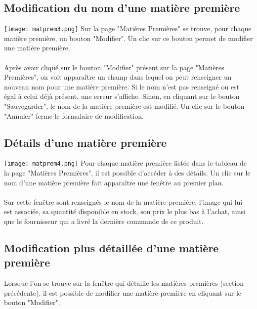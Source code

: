 \subsection{Modification du nom d'une matière première}
\texttt{[image: matprem3.png]}
Sur la page "Matières Premières" se trouve, pour chaque matière première, 
un bouton "Modifier". Un clic sur ce bouton permet de modifier une matière 
première.

\paragraph{}
Après avoir cliqué sur le bouton "Modifier" présent sur la page "Matières 
Premières", on voit apparaître un champ dans lequel on peut renseigner un 
nouveau nom pour une matière première. Si le nom n'est pas renseigné ou est 
égal à celui déjà présent, une erreur s'affiche. Sinon, en cliquant sur le 
bouton "Sauvegarder", le nom de la matière première est modifié. Un clic sur 
le bouton "Annuler" ferme le formulaire de modification.


\subsection{Détails d'une matière première}
\texttt{[image: matprem4.png]}
Pour chaque matière première listée dans le tableau de la page "Matières 
Premières", il est possible d'accéder à des détails. Un clic sur le nom d'une 
matière première fait apparaître une fenêtre au premier plan.

\paragraph{}
Sur cette fenêtre sont renseignés le nom de la matière première, l'image qui lui 
est associée, sa quantité disponible en stock, son prix le plus bas à l'achat, 
ainsi que le fournisseur qui a livré la dernière commande de ce produit.

\subsection{Modification plus détaillée d'une matière première}
Lorsque l'on se trouve sur la fenêtre qui détaille les matières premières
(section précédente), il est possible de modifier une matière première en 
cliquant sur le bouton "Modifier".

